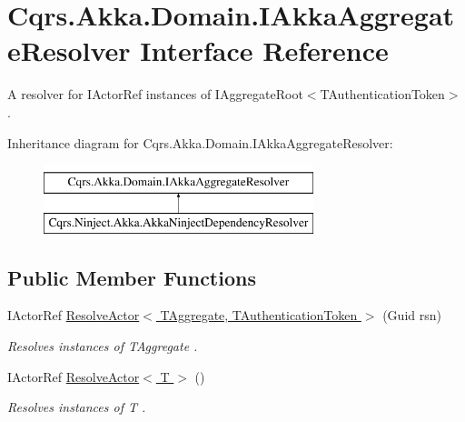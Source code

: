 \hypertarget{interfaceCqrs_1_1Akka_1_1Domain_1_1IAkkaAggregateResolver}{}\section{Cqrs.\+Akka.\+Domain.\+I\+Akka\+Aggregate\+Resolver Interface Reference}
\label{interfaceCqrs_1_1Akka_1_1Domain_1_1IAkkaAggregateResolver}


A resolver for I\+Actor\+Ref instances of I\+Aggregate\+Root$<$\+T\+Authentication\+Token$>$.  


Inheritance diagram for Cqrs.\+Akka.\+Domain.\+I\+Akka\+Aggregate\+Resolver\+:\begin{figure}[H]
\begin{center}
\leavevmode
\includegraphics[height=2.000000cm]{interfaceCqrs_1_1Akka_1_1Domain_1_1IAkkaAggregateResolver}
\end{center}
\end{figure}
\subsection*{Public Member Functions}
\begin{DoxyCompactItemize}
\item 
I\+Actor\+Ref \hyperlink{interfaceCqrs_1_1Akka_1_1Domain_1_1IAkkaAggregateResolver_a59dbc788ce9893d72684ff5c18945c1d_a59dbc788ce9893d72684ff5c18945c1d}{Resolve\+Actor$<$ T\+Aggregate, T\+Authentication\+Token $>$} (Guid rsn)
\begin{DoxyCompactList}\small\item\em Resolves instances of {\itshape T\+Aggregate} . \end{DoxyCompactList}\item 
I\+Actor\+Ref \hyperlink{interfaceCqrs_1_1Akka_1_1Domain_1_1IAkkaAggregateResolver_a9c3e3f9e8a963ea0b11e79f9eb1c55a9_a9c3e3f9e8a963ea0b11e79f9eb1c55a9}{Resolve\+Actor$<$ T $>$} ()
\begin{DoxyCompactList}\small\item\em Resolves instances of {\itshape T} . \end{DoxyCompactList}\end{DoxyCompactItemize}


